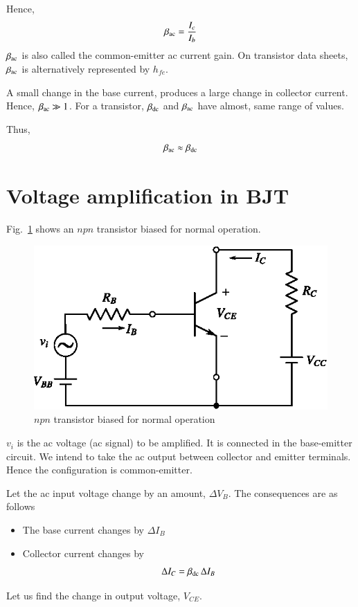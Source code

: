 \vfill\eject

Hence,
\begin{equation}
\beta_{\operatorname{ac}}=\frac{I_{c}}{I_{b}}\label{eq3.13}
\end{equation}
$\beta_{\operatorname{ac}}$ is also called the common-emitter ac current gain. On transistor data sheets, $\beta_{\operatorname{ac}}$ is alternatively represented by $h_{fe}$.

A small change in the base current, produces a large change in collector current. Hence, $\beta_{\operatorname{ac}}\gg 1$. For a transistor, $\beta_{\operatorname{dc}}$ and $\beta_{\operatorname{ac}}$ have almost, same range of values.

Thus,
\begin{equation}
\beta_{\operatorname{ac}}\approx \beta_{\operatorname{dc}}\label{eq3.14}
\end{equation}

\section{Voltage amplification in BJT}\label{sec3.15}

Fig.~\ref{fig3.17} shows an $npn$ transistor biased for normal operation.
\begin{figure}[H]
\centering
\includegraphics{chap2/fig2.17.eps}
\caption{$npn$ transistor biased for normal operation}\label{fig3.17}
\end{figure}
\noindent
$v_{i}$ is the ac voltage (ac signal) to be amplified. It is connected in the base-emitter circuit. We intend to take the ac output between collector and emitter terminals. Hence the configuration is common-emitter.

Let the ac input voltage change by an amount, $\Delta V_{B}$. The consequences are as follows
\begin{itemize}
\item The base current changes by $\Delta I_{B}$

\item Collector current changes by
\begin{equation}
\Delta I_{C}=\beta_{\operatorname{dc}}\,\Delta I_{B}\label{eq3.15}
\end{equation}
\end{itemize}
Let us find the change in output voltage, $V_{CE}$.

